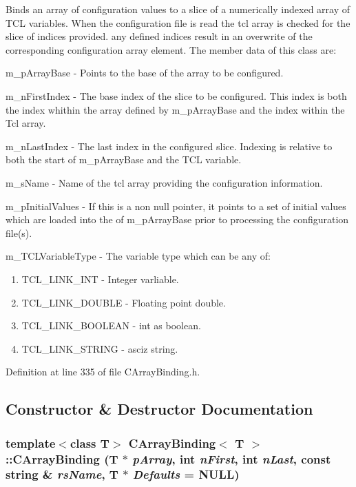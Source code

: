 Binds an array of configuration values to a slice of a numerically indexed array of TCL variables. When the configuration file is  read the tcl array is checked for the slice of indices provided. any defined indices result in an overwrite of the corresponding configuration array element.  The member data of this class are:

\begin{CompactItemize}
\item 
m\_\-p\-Array\-Base - Points to the base of the array to be configured.\item 
m\_\-n\-First\-Index - The base index of the slice to be configured. This index is both the index whithin the array defined by m\_\-p\-Array\-Base and the index within the Tcl array.\item 
m\_\-n\-Last\-Index - The last index in the configured slice. Indexing is relative to both the start of m\_\-p\-Array\-Base and the TCL variable.\item 
m\_\-s\-Name - Name of the tcl array providing the configuration information.\item 
m\_\-p\-Initial\-Values - If this is a non null pointer, it points to a set of initial values which are loaded into the of m\_\-p\-Array\-Base prior to processing the configuration file(s).\item 
m\_\-TCLVariable\-Type - The variable type which can be any of:\begin{enumerate}
\item 
TCL\_\-LINK\_\-INT - Integer varliable.\item 
TCL\_\-LINK\_\-DOUBLE - Floating point double.\item 
TCL\_\-LINK\_\-BOOLEAN - int as boolean.\item 
TCL\_\-LINK\_\-STRING - asciz string. \end{enumerate}
\end{CompactItemize}




Definition at line 335 of file CArray\-Binding.h.

\subsection{Constructor \& Destructor Documentation}
\subsubsection{\setlength{\rightskip}{0pt plus 5cm}template$<$class T$>$ CArray\-Binding$<$ T $>$::CArray\-Binding (T $\ast$ {\em p\-Array}, int {\em n\-First}, int {\em n\-Last}, const string \& {\em rs\-Name}, T $\ast$ {\em Defaults} = NULL)}\label{classCArrayBinding_a0}



